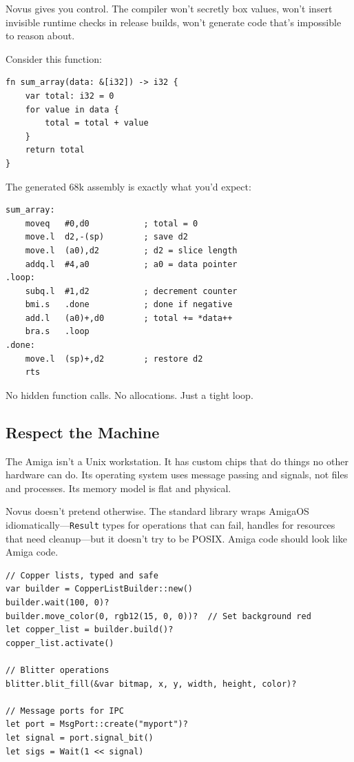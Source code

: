 Novus gives you control. The compiler won't secretly box values, won't insert invisible runtime checks in release builds, won't generate code that's impossible to reason about.

Consider this function:

\begin{lstlisting}
fn sum_array(data: &[i32]) -> i32 {
    var total: i32 = 0
    for value in data {
        total = total + value
    }
    return total
}
\end{lstlisting}

The generated 68k assembly is exactly what you'd expect:

\begin{lstlisting}[style=bash]
sum_array:
    moveq   #0,d0           ; total = 0
    move.l  d2,-(sp)        ; save d2
    move.l  (a0),d2         ; d2 = slice length
    addq.l  #4,a0           ; a0 = data pointer
.loop:
    subq.l  #1,d2           ; decrement counter
    bmi.s   .done           ; done if negative
    add.l   (a0)+,d0        ; total += *data++
    bra.s   .loop
.done:
    move.l  (sp)+,d2        ; restore d2
    rts
\end{lstlisting}

No hidden function calls. No allocations. Just a tight loop.

\subsection{Respect the Machine}

The Amiga isn't a Unix workstation. It has custom chips that do things no other hardware can do. Its operating system uses message passing and signals, not files and processes. Its memory model is flat and physical.

Novus doesn't pretend otherwise. The standard library wraps AmigaOS idiomatically---\texttt{Result} types for operations that can fail, handles for resources that need cleanup---but it doesn't try to be POSIX. Amiga code should look like Amiga code.

\begin{lstlisting}
// Copper lists, typed and safe
var builder = CopperListBuilder::new()
builder.wait(100, 0)?
builder.move_color(0, rgb12(15, 0, 0))?  // Set background red
let copper_list = builder.build()?
copper_list.activate()

// Blitter operations
blitter.blit_fill(&var bitmap, x, y, width, height, color)?

// Message ports for IPC
let port = MsgPort::create("myport")?
let signal = port.signal_bit()
let sigs = Wait(1 << signal)
\end{lstlisting}

